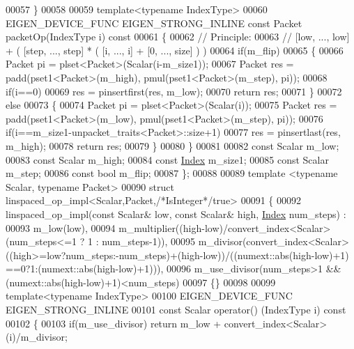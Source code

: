 \begin{DoxyCode}
00057   \}
00058 
00059   \textcolor{keyword}{template}<\textcolor{keyword}{typename} IndexType>
00060   EIGEN\_DEVICE\_FUNC EIGEN\_STRONG\_INLINE \textcolor{keyword}{const} Packet packetOp(IndexType i)\textcolor{keyword}{ const}
00061 \textcolor{keyword}{  }\{
00062     \textcolor{comment}{// Principle:}
00063     \textcolor{comment}{// [low, ..., low] + ( [step, ..., step] * ( [i, ..., i] + [0, ..., size] ) )}
00064     \textcolor{keywordflow}{if}(m\_flip)
00065     \{
00066       Packet pi = plset<Packet>(Scalar(i-m\_size1));
00067       Packet res = padd(pset1<Packet>(m\_high), pmul(pset1<Packet>(m\_step), pi));
00068       \textcolor{keywordflow}{if}(i==0)
00069         res = pinsertfirst(res, m\_low);
00070       \textcolor{keywordflow}{return} res;
00071     \}
00072     \textcolor{keywordflow}{else}
00073     \{
00074       Packet pi = plset<Packet>(Scalar(i));
00075       Packet res = padd(pset1<Packet>(m\_low), pmul(pset1<Packet>(m\_step), pi));
00076       \textcolor{keywordflow}{if}(i==m\_size1-unpacket\_traits<Packet>::size+1)
00077         res = pinsertlast(res, m\_high);
00078       \textcolor{keywordflow}{return} res;
00079     \}
00080   \}
00081 
00082   \textcolor{keyword}{const} Scalar m\_low;
00083   \textcolor{keyword}{const} Scalar m\_high;
00084   \textcolor{keyword}{const} \hyperlink{namespace_eigen_a62e77e0933482dafde8fe197d9a2cfde}{Index} m\_size1;
00085   \textcolor{keyword}{const} Scalar m\_step;
00086   \textcolor{keyword}{const} \textcolor{keywordtype}{bool} m\_flip;
00087 \};
00088 
00089 \textcolor{keyword}{template} <\textcolor{keyword}{typename} Scalar, \textcolor{keyword}{typename} Packet>
00090 \textcolor{keyword}{struct }linspaced\_op\_impl<Scalar,Packet,\textcolor{comment}{/*IsInteger*/}true>
00091 \{
00092   linspaced\_op\_impl(\textcolor{keyword}{const} Scalar& low, \textcolor{keyword}{const} Scalar& high, \hyperlink{namespace_eigen_a62e77e0933482dafde8fe197d9a2cfde}{Index} num\_steps) :
00093     m\_low(low),
00094     m\_multiplier((high-low)/convert\_index<Scalar>(num\_steps<=1 ? 1 : num\_steps-1)),
00095     m\_divisor(convert\_index<Scalar>((high>=low?num\_steps:-num\_steps)+(high-low))/((numext::abs(high-low)+1)
      ==0?1:(numext::abs(high-low)+1))),
00096     m\_use\_divisor(num\_steps>1 && (numext::abs(high-low)+1)<num\_steps)
00097   \{\}
00098 
00099   \textcolor{keyword}{template}<\textcolor{keyword}{typename} IndexType>
00100   EIGEN\_DEVICE\_FUNC EIGEN\_STRONG\_INLINE
00101   \textcolor{keyword}{const} Scalar operator() (IndexType i)\textcolor{keyword}{ const}
00102 \textcolor{keyword}{  }\{
00103     \textcolor{keywordflow}{if}(m\_use\_divisor) \textcolor{keywordflow}{return} m\_low + convert\_index<Scalar>(i)/m\_divisor;

\end{DoxyCode}
